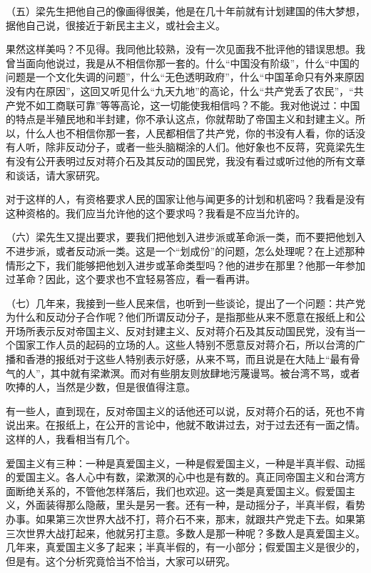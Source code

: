 （五）梁先生把他自己的像画得很美，他是在几十年前就有计划建国的伟大梦想，据他自己说，很接近于新民主主义，或社会主义。

果然这样美吗？不见得。我同他比较熟，没有一次见面我不批评他的错误思想。我曾当面向他说过，我是从不相信你那一套的。什么“中国没有阶级”，什么“中国的问题是一个文化失调的问题”，什么“无色透明政府”，什么“中国革命只有外来原因没有内在原因”，这回又听见什么“九天九地”的高论，什么“共产党丢了农民”，“共产党不如工商联可靠”等等高论，这一切能使我相信吗？不能。我对他说过：中国的特点是半殖民地和半封建，你不承认这点，你就帮助了帝国主义和封建主义。所以，什么人也不相信你那一套，人民都相信了共产党，你的书没有人看，你的话没有人听，除非反动分子，或者一些头脑糊涂的人们。他好象也不反蒋，究竟梁先生有没有公开表明过反对蒋介石及其反动的国民党，我没有看过或听过他的所有文章和谈话，请大家研究。

对于这样的人，有资格要求人民的国家让他与闻更多的计划和机密吗？我看是没有这种资格的。我们应当允许他的这个要求吗？我看是不应当允许的。

（六）梁先生又提出要求，要我们把他划入进步派或革命派一类，而不要把他划入不进步派，或者反动派一类。这是一个“划成份”的问题，怎么处理呢？在上述那种情形之下，我们能够把他划入进步或革命类型吗？他的进步在那里？他那一年参加过革命？因此，这个要求也不宜轻易答应，看一看再讲。

（七）几年来，我接到一些人民来信，也听到一些谈论，提出了一个问题：共产党为什么和反动分子合作呢？他们所谓反动分子，是指那些从来不愿意在报纸上和公开场所表示反对帝国主义、反对封建主义、反对蒋介石及其反动国民党，没有当一个国家工作人员的起码的立场的人。这些人特别不愿意反对蒋介石，所以台湾的广播和香港的报纸对于这些人特别表示好感，从来不骂，而且说是在大陆上“最有骨气的人”，其中就有梁漱溟。而对有些朋友则放肆地污蔑谩骂。被台湾不骂，或者吹捧的人，当然是少数，但是很值得注意。

有一些人，直到现在，反对帝国主义的话他还可以说，反对蒋介石的话，死也不肯说出来。在报纸上，在公开的言论中，他就不敢讲过去，对于过去还有一面之情。这样的人，我看相当有几个。

爱国主义有三种：一种是真爱国主义，一种是假爱国主义，一种是半真半假、动摇的爱国主义。各人心中有数，梁漱溟的心中也是有数的。真正同帝国主义和台湾方面断绝关系的，不管他怎样落后，我们也欢迎。这一类是真爱国主义。假爱国主义，外面装得那么隐蔽，里头是另一套。还有一种，是动摇分子，半真半假，看势办事。如果第三次世界大战不打，蒋介石不来，那末，就跟共产党走下去。如果第三次世界大战打起来，他就另打主意。多数人是那一种呢？多数人是真爱国主义。几年来，真爱国主义多了起来；半真半假的，有一小部分；假爱国主义是很少的，但是有。这个分析究竟恰当不恰当，大家可以研究。


